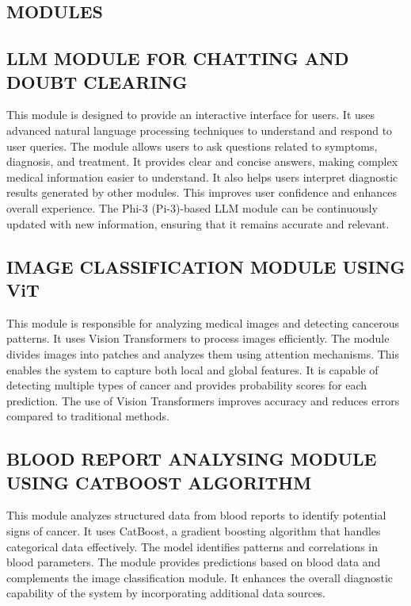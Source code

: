 \documentclass[a4paper,12pt]{report}
\begin{document}
\begin{doublespace}
\section{MODULES}
\label{sec:modules}

\subsection{LLM MODULE FOR CHATTING AND DOUBT CLEARING}
\label{sec:llm_module}

This module is designed to provide an interactive interface for users. It uses advanced natural language processing techniques to understand and respond to user queries.
The module allows users to ask questions related to symptoms, diagnosis, and treatment. It provides clear and concise answers, making complex medical information easier to understand.
It also helps users interpret diagnostic results generated by other modules. This improves user confidence and enhances overall experience.
The Phi-3 (Pi-3)-based LLM module can be continuously updated with new information, ensuring that it remains accurate and relevant.
\subsection{IMAGE CLASSIFICATION MODULE USING ViT}
\label{sec:vit_module}

This module is responsible for analyzing medical images and detecting cancerous patterns. It uses Vision Transformers to process images efficiently.
The module divides images into patches and analyzes them using attention mechanisms. This enables the system to capture both local and global features.
It is capable of detecting multiple types of cancer and provides probability scores for each prediction.
The use of Vision Transformers improves accuracy and reduces errors compared to traditional methods.


\subsection{BLOOD REPORT ANALYSING MODULE USING CATBOOST ALGORITHM}

This module analyzes structured data from blood reports to identify potential signs of cancer.
It uses CatBoost, a gradient boosting algorithm that handles categorical data effectively. The model identifies patterns and correlations in blood parameters.
The module provides predictions based on blood data and complements the image classification module.
It enhances the overall diagnostic capability of the system by incorporating additional data sources.

\end{doublespace}
\end{document}

